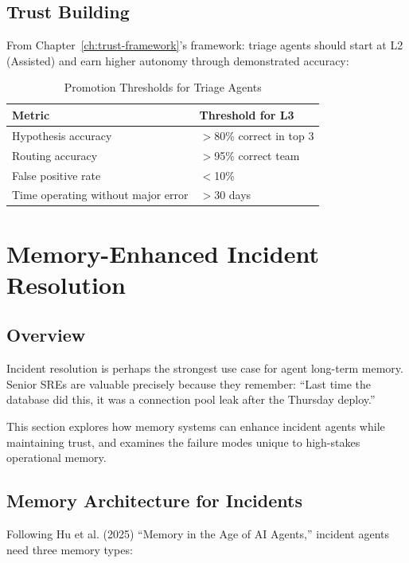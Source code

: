 \subsection{Trust Building}
\label{subsec:trust-building-triage}

From Chapter~\ref{ch:trust-framework}'s framework: triage agents should start at L2 (Assisted) and earn higher autonomy through demonstrated accuracy:

\begin{table}[htbp]
\centering
\caption{Promotion Thresholds for Triage Agents}
\label{tab:triage-promotion}
\begin{tabular}{ll}
\toprule
\textbf{Metric} & \textbf{Threshold for L3} \\
\midrule
Hypothesis accuracy & $>$80\% correct in top 3 \\
Routing accuracy & $>$95\% correct team \\
False positive rate & $<$10\% \\
Time operating without major error & $>$30 days \\
\bottomrule
\end{tabular}
\end{table}

\section{Memory-Enhanced Incident Resolution}
\label{sec:memory-enhanced}

\subsection{Overview}
\label{subsec:memory-overview}

Incident resolution is perhaps the strongest use case for agent long-term memory. Senior SREs are valuable precisely because they remember: ``Last time the database did this, it was a connection pool leak after the Thursday deploy.''

This section explores how memory systems can enhance incident agents while maintaining trust, and examines the failure modes unique to high-stakes operational memory.

\subsection{Memory Architecture for Incidents}
\label{subsec:memory-architecture}

Following Hu et al. (2025) ``Memory in the Age of AI Agents,'' incident agents need three memory types:

